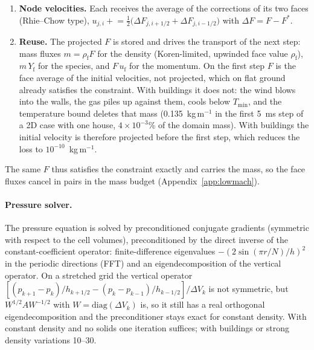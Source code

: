 \documentclass[11pt,a4paper]{article}
\begin{document}
\begin{enumerate}
        cell, so its vertical part counts double, $2F_{1/2}/\Delta z$ ($F_{1/2}/\Delta V_0$ on a stretched
        grid, where in general the vertical differences of $D$ divide by $\Delta V_k$ and the face
        gradients by $h_{k+1/2}$). The face between rows $N_z-2$ and
        $N_z-1$ is the open top, with $p=0$ on the top row. Faces next to solids are closed: zero flux and a
        zero-gradient pressure condition, exactly.
  \item \textbf{Node velocities.} Each receives the average of the corrections of its two faces
        (Rhie--Chow type), $u_{j,i}\mathrel{+}=\tfrac12\big(\Delta F_{j,i+1/2}+\Delta F_{j,i-1/2}\big)$ with
        $\Delta F=F-F^*$.
  \item \textbf{Reuse.} The projected $F$ is stored and drives the transport of the next step: mass fluxes
        $m=\rho_\text{f}F$ for the density (Koren-limited, upwinded face value $\rho_\text{f}$), $m\,Y_\text{f}$
        for the species, and $F\,u_\text{f}$ for the momentum. On the first step $F$ is the face average of
        the initial velocities, not projected, which on flat ground already satisfies the constraint. With
        buildings it does not: the wind blows into the walls, the gas piles up against them, cools below
        $T_\text{min}$, and the temperature bound deletes that mass (0.135~kg\,m$^{-1}$ in the first 5~ms step of a
        2D case with one house, $4\times10^{-3}$\% of the domain mass). With buildings the initial velocity is
        therefore projected before the first step, which reduces the loss to $10^{-10}$~kg\,m$^{-1}$.
\end{enumerate}
The same $F$ thus satisfies the constraint exactly and carries the mass, so the face fluxes cancel in
pairs in the mass budget (Appendix~\ref{app:lowmach}).

\paragraph{Pressure solver.} The pressure equation is solved by preconditioned conjugate gradients
(symmetric with respect to the cell volumes), preconditioned by the direct inverse of the
constant-coefficient operator: finite-difference eigenvalues $-(2\sin(\pi r/N)/h)^2$ in the periodic
directions (FFT) and an eigendecomposition of the vertical operator. On a stretched grid the vertical
operator $[(p_{k+1}-p_k)/h_{k+1/2}-(p_k-p_{k-1})/h_{k-1/2}]/\Delta V_k$ is not symmetric, but
$W^{1/2}AW^{-1/2}$ with $W=\mathrm{diag}(\Delta V_k)$ is, so it still has a real orthogonal
eigendecomposition and the preconditioner stays exact for constant density. With constant density and no
solids one iteration suffices; with buildings or strong density variations 10--30.
\end{document}

